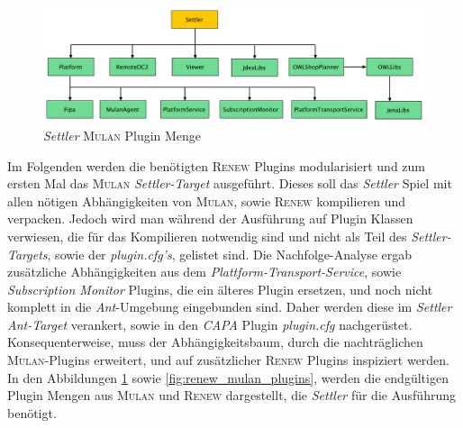 	\begin{figure}[h!]
	  \centering
	  \includegraphics[width=\textwidth]{material/images/settler-mulan-plugins.pdf}
	  \caption{\textit{Settler} \textsc{Mulan} Plugin Menge}
	  \label{fig:settler_mulan_plugins}
	\end{figure}

	Im Folgenden werden die benötigten \textsc{Renew} Plugins modularisiert und zum ersten Mal das \textsc{Mulan} \textit{Settler-Target} ausgeführt. Dieses soll das \textit{Settler} Spiel mit allen nötigen Abhängigkeiten von \textsc{Mulan}, sowie \textsc{Renew} kompilieren und verpacken. Jedoch wird man während der Ausführung auf Plugin Klassen verwiesen, die für das Kompilieren notwendig sind und nicht als Teil des \textit{Settler-Targets}, sowie der \textit{plugin.cfg's}, gelistet sind. \newline
	Die Nachfolge-Analyse ergab zusätzliche Abhängigkeiten aus dem \textit{Plattform-Transport-Service}, sowie \textit{Subscription Monitor} Plugins, die ein älteres Plugin ersetzen, und noch nicht komplett in die \textit{Ant}-Umgebung eingebunden sind. Daher werden diese im \textit{Settler} \textit{Ant-Target} verankert, sowie in den \textit{CAPA} Plugin \textit{plugin.cfg} nachgerüstet. Konsequenterweise, muss der Abhängigkeitsbaum, durch die nachträglichen \textsc{Mulan}-Plugins erweitert, und auf zusätzlicher \textsc{Renew} Plugins inspiziert werden. \newline
	In den Abbildungen \ref{fig:settler_mulan_plugins} sowie \ref{fig:renew_mulan_plugins}, werden die endgültigen Plugin Mengen aus \textsc{Mulan} und \textsc{Renew} dargestellt, die \textit{Settler} für die Ausführung benötigt. \bigbreak

